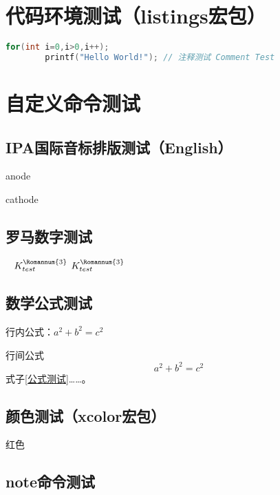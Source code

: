 \section{代码环境测试（listings宏包）}
\sampletext

\begin{lstlisting}[language={C},title={\textsf{C语言代码段测试}}]
    for(int i=0,i>0,i++);
        printf("Hello World!"); // 注释测试 Comment Test
\end{lstlisting}

\sampletext

\section{自定义命令测试}
\subsection{IPA国际音标排版测试（English）}
anode 

cathode 

\subsection{罗马数字测试}
\  $K_{test}^{\text{\Romannum{3}}}$ $K_{test}^{\mathrm{\Romannum{3}}}$

\subsection{数学公式测试}
行内公式：$a^2 + b^2 = c^2$

行间公式
\begin{equation}
    a^2 + b^2 = c^2 \label{公式测试}
\end{equation}
式子\eqref{公式测试}……。

\subsection{颜色测试（xcolor宏包）}
 { 红色}


\subsection{note命令测试}



